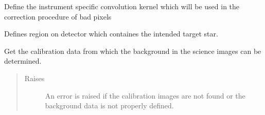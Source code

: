 \documentclass[a4paper,10pt,english]{sphinxmanual}
\begin{document}
\begin{fulllineitems}
\begin{fulllineitems}
\begin{quote}
\begin{description}
\end{description}\end{quote}

\end{fulllineitems}


\begin{fulllineitems}
\label{\detokenize{cascade.instruments:cascade.instruments.instruments.HSTWFC3._define_convolution_kernel}}
Define the instrument specific convolution kernel which will be used
in the correction procedure of bad pixels

\end{fulllineitems}


\begin{fulllineitems}
\label{\detokenize{cascade.instruments:cascade.instruments.instruments.HSTWFC3._define_region_of_interest}}
Defines region on detector which containes the intended target star.

\end{fulllineitems}


\begin{fulllineitems}
\label{\detokenize{cascade.instruments:cascade.instruments.instruments.HSTWFC3._get_background_cal_data}}
Get the calibration data from which the background in the science
images can be determined.
\begin{quote}\begin{description}
\item[{Raises}] \leavevmode
{} \textendash{} An error is raised if the calibration images are not found or the
background data is not properly defined.

\end{description}\end{quote}


\end{fulllineitems}
\end{fulllineitems}
\end{document}
